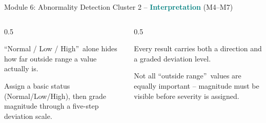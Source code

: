 \documentclass[9pt,aspectratio=169]{beamer}
\begin{document}
\begin{frame}{Module 6: Abnormality Detection}
\textcolor{black!55}{\scriptsize Cluster 2 -- \textcolor{teal}{\textbf{Interpretation}} (M4--M7)}\\[2pt]
\begin{columns}[T,onlytextwidth]
\begin{column}{0.5\textwidth}
\begin{tcolorbox}[colback=blue!7,colframe=blue!55!black,title=\textbf{Motivation},boxrule=0.6pt,arc=1mm,left=5pt,right=5pt,top=3pt,bottom=3pt,fonttitle=\small]
\footnotesize \textquotedblleft Normal / Low / High\textquotedblright\ alone hides how far outside range a value actually is.
\end{tcolorbox}
\vspace{5pt}
\begin{tcolorbox}[colback=teal!7,colframe=teal!55!black,title=\textbf{Method},boxrule=0.6pt,arc=1mm,left=5pt,right=5pt,top=3pt,bottom=3pt,fonttitle=\small]
\footnotesize Assign a basic status (Normal/Low/High), then grade magnitude through a five-step deviation scale.
\end{tcolorbox}
\end{column}
\begin{column}{0.5\textwidth}
\begin{tcolorbox}[colback=green!8,colframe=green!45!black,title=\textbf{Result},boxrule=0.6pt,arc=1mm,left=5pt,right=5pt,top=3pt,bottom=3pt,fonttitle=\small]
\footnotesize Every result carries both a direction and a graded deviation level.
\end{tcolorbox}
\vspace{5pt}
\begin{tcolorbox}[colback=orange!10,colframe=orange!65!black,title=\textbf{Conclusion},boxrule=0.6pt,arc=1mm,left=5pt,right=5pt,top=3pt,bottom=3pt,fonttitle=\small]
\footnotesize Not all \textquotedblleft outside range\textquotedblright\ values are equally important -- magnitude must be visible before severity is assigned.
\end{tcolorbox}
\end{column}
\end{columns}
\end{frame}
\end{document}
